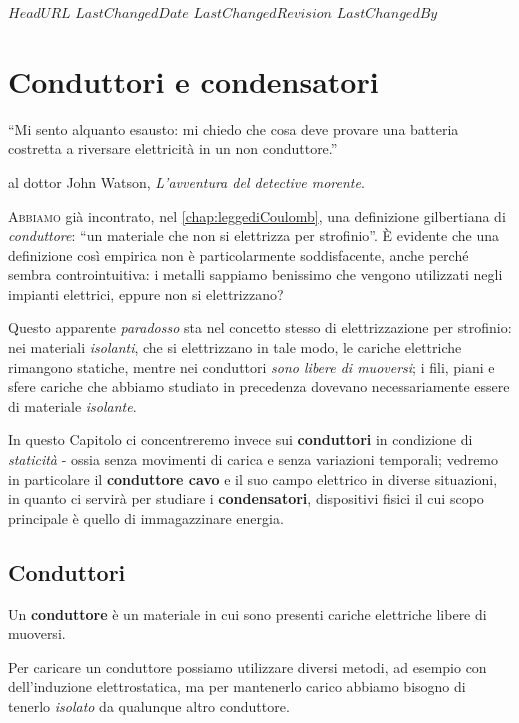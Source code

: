 \svnidlong
{$HeadURL$}
{$LastChangedDate$}
{$LastChangedRevision$}
{$LastChangedBy$}

\chapter{Conduttori e condensatori}

\begin{introduction}
	``Mi sento alquanto esausto: mi chiedo che cosa
	deve provare una batteria costretta a riversare elettricità in un non conduttore.''
	\begin{flushright}
		 al dottor John Watson, \emph{L'avventura del detective morente}.
	\end{flushright}
\end{introduction}
\lettrine[findent=1pt, nindent=0pt]{A}{bbiamo} già incontrato, nel \autoref{chap:leggediCoulomb}, una definizione gilbertiana di \textit{conduttore}: ``un materiale che non si elettrizza per strofinio''. È evidente che una definizione così empirica non è particolarmente soddisfacente, anche perché sembra controintuitiva: i metalli sappiamo benissimo che vengono utilizzati negli impianti elettrici, eppure non si elettrizzano?

Questo apparente \textit{paradosso} sta nel concetto stesso di elettrizzazione per strofinio: nei materiali \textit{isolanti}, che si elettrizzano in tale modo, le cariche elettriche rimangono statiche, mentre nei conduttori \textit{sono libere di muoversi}; i fili, piani e sfere cariche che abbiamo studiato in precedenza dovevano necessariamente essere di materiale \textit{isolante}.

In questo Capitolo ci concentreremo invece sui \textbf{conduttori} in condizione di \textit{staticità} - ossia senza movimenti di carica e senza variazioni temporali; vedremo in particolare il \textbf{conduttore cavo} e il suo campo elettrico in diverse situazioni, in quanto ci servirà per studiare i \textbf{condensatori}, dispositivi fisici il cui scopo principale è quello di immagazzinare energia.
\section{Conduttori}
\begin{define}[Conduttore]
	Un \textbf{conduttore} è un materiale in cui sono presenti cariche elettriche libere di muoversi.
\end{define}
Per caricare un conduttore possiamo utilizzare diversi metodi, ad esempio con dell'induzione elettrostatica, ma per mantenerlo carico abbiamo bisogno di tenerlo \textit{isolato} da qualunque altro conduttore.

